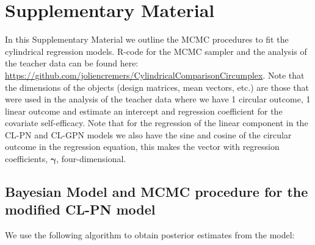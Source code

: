 \documentclass[12pt,]{article}
\title{}
\author{}
\date{}
\begin{document}
\section{Supplementary Material}\label{Appendix}

In this Supplementary Material we outline the MCMC procedures to fit the
cylindrical regression models. R-code for the MCMC sampler and the
analysis of the teacher data can be found here:
\url{https://github.com/joliencremers/CylindricalComparisonCircumplex}.
Note that the dimensions of the objects (design matrices, mean vectors,
etc.) are those that were used in the analysis of the teacher data where
we have 1 circular outcome, 1 linear outcome and estimate an intercept
and regression coefficient for the covariate self-efficacy. Note that
for the regression of the linear component in the CL-PN and CL-GPN
models we also have the sine and cosine of the circular outcome in the
regression equation, this makes the vector with regression coefficients,
\(\boldsymbol{\gamma}\), four-dimensional.

\subsection{Bayesian Model and MCMC procedure for the modified CL-PN model}\label{A1}

We use the following algorithm to obtain posterior estimates from the
model:
\end{document}
